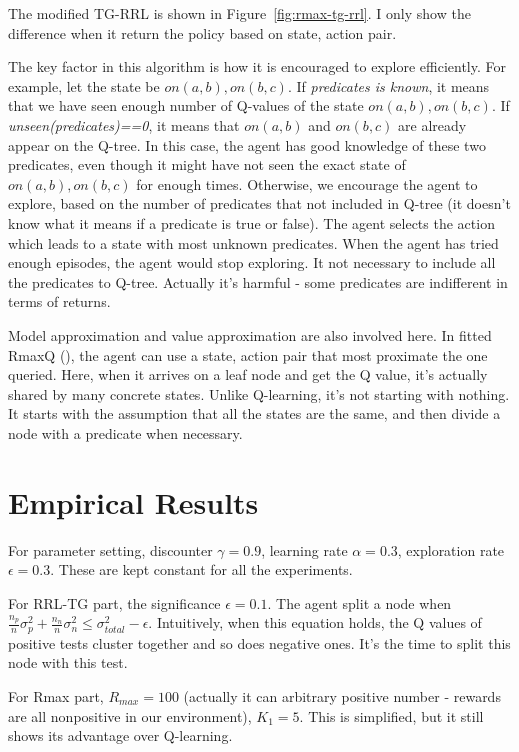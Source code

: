 \documentclass[10pt]{article}
\begin{document}
The modified TG-RRL is shown in Figure~\ref{fig:rmax-tg-rrl}. I only show the
difference when it return the policy based on state, action pair.

The key factor in this algorithm is how it is encouraged to explore efficiently.
For example, let the state be $on(a,b),on(b,c)$. If \textit{predicates is
known}, it means that we have seen enough number of Q-values of the state
$on(a,b),on(b,c)$.  If \textit{unseen(predicates)==0}, it means that $on(a,b)$
and $on(b,c)$ are already appear on the Q-tree. In this case, the agent has good
knowledge of these two predicates, even though it might have not seen the exact
state of $on(a,b),on(b,c)$ for enough times. Otherwise, we encourage the agent
to explore, based on the number of predicates that not included in Q-tree (it
doesn't know what it means if a predicate is true or false). The agent selects
the action which leads to a state with most unknown predicates. When the agent
has tried enough episodes, the agent would stop exploring. It not necessary to
include all the predicates to Q-tree. Actually it's harmful - some predicates
are indifferent in terms of returns.

Model approximation and value approximation are also involved here. In fitted
RmaxQ (\cite{ICML08-jong}), the agent can use a state, action pair that most
proximate the one queried. Here, when it arrives on a leaf node and get the Q
value, it's actually shared by many concrete states. Unlike Q-learning, it's not
starting with nothing. It starts with the assumption that all the states are
the same, and then divide a node with a predicate when necessary.

\section{Empirical Results}

For parameter setting, discounter $\gamma = 0.9$, learning rate $\alpha = 0.3$,
exploration rate $\epsilon = 0.3$. These are kept constant for all the
experiments.

For RRL-TG part, the significance $\epsilon = 0.1$. The agent split a node when 
$\frac{n_p}{n} \sigma^2_p + \frac{n_n}{n} \sigma^2_n \leq \sigma^2_{total} -
\epsilon$. Intuitively, when this equation holds, the Q values of positive tests
cluster together and so does negative ones. It's the time to split this node
with this test.

For Rmax part, $R_{max} = 100$ (actually it can arbitrary positive number -
rewards are all nonpositive in our environment), $K_1 = 5$. This is simplified,
but it still shows its advantage over Q-learning.
\end{document}
